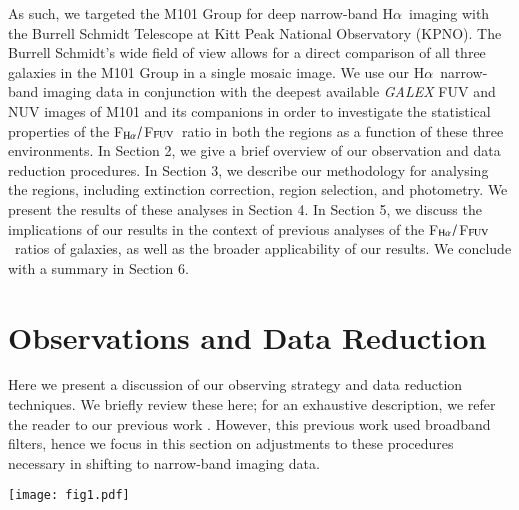 \documentclass[iop]{emulateapj}
\newcommand{\ha}{H$\alpha$}
\newcommand{\hafuv}{F$_{\rm H\alpha}/$F$_{\rm FUV}$}
\newcommand{\sbunit}{ergs s$^{-1}$ cm$^{-2}$ arcsec$^{-2}$}
\begin{document}
As such, we targeted the M101 Group for deep narrow-band \ha \ imaging
with the Burrell Schmidt Telescope at Kitt Peak National Observatory
(KPNO).  The Burrell Schmidt's wide field of view allows for a direct
comparison of all three galaxies in the M101 Group in a single mosaic
image.  We use our \ha \ narrow-band imaging data in conjunction with
the deepest available \emph{GALEX} FUV and NUV images of M101 and its
companions in order to investigate the statistical properties of the
\hafuv \ ratio in both the  regions as a function of these
three environments.  In Section 2, we give a brief overview of our
observation and data reduction procedures.  In Section 3, we describe
our methodology for analysing the  regions, including
extinction correction,  region selection, and photometry.
We present the results of these analyses in Section 4.  In Section 5,
we discuss the implications of our results in the context of previous
analyses of the \hafuv \ ratios of galaxies, as well as the broader
applicability of our results.  We conclude with a summary in Section
6.

\section{Observations and Data Reduction}

Here we present a discussion of our observing strategy and data
reduction techniques.  We briefly review these here; for an exhaustive
description, we refer the reader to our previous work \citep[and
  references therein]{watkins14, mihos17}.  However, this previous
work used broadband filters, hence we focus in this section on
adjustments to these procedures necessary in shifting to narrow-band
imaging data.

\begin{figure*}
  \centering
  \texttt{[image: fig1.pdf]}
  \caption[\ha \ difference image mosaic of the M101 Group]{A view of our
    difference image mosaic, showing \ha \ emission in M101 and its
    companions.  Insets are shown of NGC~5477, NGC~5474, and the
    eastern side of M101 containing the giant  region
    complexes NGC~5471 (center frame) and NGC~5462 (at the lower
    right), to showcase the wealth of low surface brightness structure
    we detect.  Pixels saturate (white) in this image at
    $\sim$2.85$\times 10^{-16}$ \sbunit. North is up and east is to
    the left.
    \label{fig:diffim}}
\end{figure*}
\end{document}
